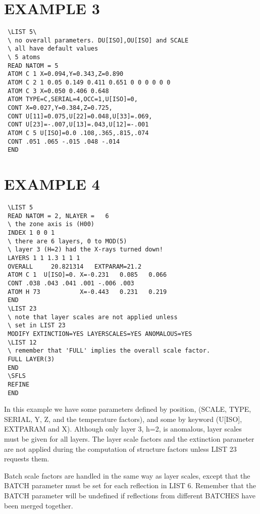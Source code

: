 \documentclass[10pt,a4paper]{report}
\begin{document}
\section{EXAMPLE 3}
\small\begin{verbatim}
 \LIST 5\
 \ no overall parameters. DU[ISO],OU[ISO] and SCALE 
 \ all have default values
 \ 5 atoms
 READ NATOM = 5
 ATOM C 1 X=0.094,Y=0.343,Z=0.890
 ATOM C 2 1 0.05 0.149 0.411 0.651 0 0 0 0 0 0
 ATOM C 3 X=0.050 0.406 0.648
 ATOM TYPE=C,SERIAL=4,OCC=1,U[ISO]=0,
 CONT X=0.027,Y=0.384,Z=0.725,
 CONT U[11]=0.075,U[22]=0.048,U[33]=.069,
 CONT U[23]=-.007,U[13]=.043,U[12]=-.001
 ATOM C 5 U[ISO]=0.0 .108,.365,.815,.074 
 CONT .051 .065 -.015 .048 -.014
 END
\end{verbatim}\normalsize



\section{EXAMPLE 4}
\small\begin{verbatim}
 \LIST 5
 READ NATOM = 2, NLAYER =   6
 \ the zone axis is (H00)
 INDEX 1 0 0 1
 \ there are 6 layers, 0 to MOD(5)
 \ layer 3 (H=2) had the X-rays turned down!
 LAYERS 1 1 1.3 1 1 1
 OVERALL     20.821314   EXTPARAM=21.2
 ATOM C 1  U[ISO]=0. X=-0.231   0.085   0.066 
 CONT .038 .043 .041 .001 -.006 .003
 ATOM H 73           X=-0.443   0.231   0.219
 END
 \LIST 23
 \ note that layer scales are not applied unless
 \ set in LIST 23
 MODIFY EXTINCTION=YES LAYERSCALES=YES ANOMALOUS=YES
 \LIST 12
 \ remember that 'FULL' implies the overall scale factor.
 FULL LAYER(3)
 END
 \SFLS
 REFINE
 END
\end{verbatim}\normalsize




In this example we have some parameters defined by position, (SCALE,
 TYPE, SERIAL, Y, Z, and the temperature factors), and some by keyword
 (U[ISO], EXTPARAM and X). Although only layer 3, h=2, is anomalous,
 layer scales must be given for all layers. The layer scale factors and
 the extinction parameter are
 not applied during the computation of structure factors unless LIST 23
 requests them.


Batch scale factors are handled in the same way as layer scales, except
 that the BATCH parameter must be set for each reflection in LIST 6.
 Remember that the BATCH parameter will be undefined if reflections 
 from different BATCHES have been merged together.
\end{document}
